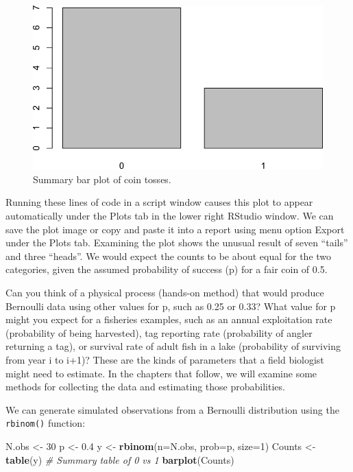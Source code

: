 \documentclass[
]{krantz}
\makeatletter
\newenvironment{Shaded}{\begin{snugshade}}{\end{snugshade}}
\newcommand{\AttributeTok}[1]{\textcolor[rgb]{0.27,0.27,0.27}{#1}}
\newcommand{\CommentTok}[1]{\textcolor[rgb]{0.37,0.37,0.37}{\textit{#1}}}
\newcommand{\DecValTok}[1]{\textcolor[rgb]{0.06,0.06,0.06}{#1}}
\newcommand{\FloatTok}[1]{\textcolor[rgb]{0.06,0.06,0.06}{#1}}
\newcommand{\FunctionTok}[1]{\textcolor[rgb]{0.27,0.27,0.27}{\textbf{#1}}}
\newcommand{\NormalTok}[1]{#1}
\newcommand{\OtherTok}[1]{\textcolor[rgb]{0.37,0.37,0.37}{#1}}
\newenvironment{kframe}{%
\medskip{}
\setlength{\fboxsep}{.8em}
 \def\at@end@of@kframe{}%
 \ifinner\ifhmode%
  \def\at@end@of@kframe{\end{minipage}}%
  \begin{minipage}{\columnwidth}%
 \fi\fi%
 \def\FrameCommand##1{\hskip\@totalleftmargin \hskip-\fboxsep
 \colorbox{shadecolor}{##1}\hskip-\fboxsep
     \hskip-\linewidth \hskip-\@totalleftmargin \hskip\columnwidth}%
 \MakeFramed {\advance\hsize-\width
   \@totalleftmargin\z@ \linewidth\hsize
   \@setminipage}}%
 {\par\unskip\endMakeFramed%
 \at@end@of@kframe}
\renewenvironment{Shaded}{\begin{kframe}}{\end{kframe}}
\makeatother
\begin{document}
\begin{figure}
\includegraphics[width=0.9\linewidth]{bookdown_files/figure-latex/coinToss-1} \caption{Summary bar plot of coin tosses.}\label{fig:coinToss}
\end{figure}

Running these lines of code in a script window causes this plot to appear automatically under the Plots tab in the lower right RStudio window. We can save the plot image or copy and paste it into a report using menu option Export under the Plots tab. Examining the plot shows the unusual result of seven ``tails'' and three ``heads''. We would expect the counts to be about equal for the two categories, given the assumed probability of success (p) for a fair coin of 0.5.

Can you think of a physical process (hands-on method) that would produce Bernoulli data using other values for p, such as 0.25 or 0.33? What value for p might you expect for a fisheries examples, such as an annual exploitation rate (probability of being harvested), tag reporting rate (probability of angler returning a tag), or survival rate of adult fish in a lake (probability of surviving from year i to i+1)? These are the kinds of parameters that a field biologist might need to estimate. In the chapters that follow, we will examine some methods for collecting the data and estimating those probabilities.

We can generate simulated observations from a Bernoulli distribution using the \texttt{rbinom()} function:

\begin{Shaded}
\begin{Highlighting}[]
\NormalTok{N.obs }\OtherTok{\textless{}{-}} \DecValTok{30}
\NormalTok{p }\OtherTok{\textless{}{-}} \FloatTok{0.4}
\NormalTok{y }\OtherTok{\textless{}{-}} \FunctionTok{rbinom}\NormalTok{(}\AttributeTok{n=}\NormalTok{N.obs, }\AttributeTok{prob=}\NormalTok{p, }\AttributeTok{size=}\DecValTok{1}\NormalTok{)}
\NormalTok{Counts }\OtherTok{\textless{}{-}} \FunctionTok{table}\NormalTok{(y)  }\CommentTok{\# Summary table of 0 vs 1}
\FunctionTok{barplot}\NormalTok{(Counts)}
\end{Highlighting}
\end{Shaded}
\end{document}
